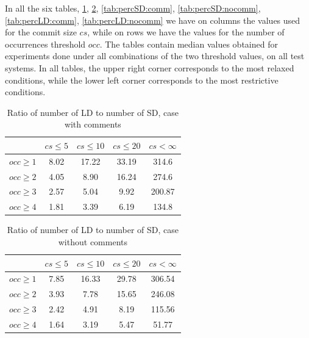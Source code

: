 \documentclass[a4paper,twoside]{article}
\begin{document}
In all the six tables, \ref{tab:ratio:comm}, \ref{tab:ratio:nocomm}, \ref{tab:percSD:comm}, \ref{tab:percSD:nocomm},
\ref{tab:percLD:comm}, \ref{tab:percLD:nocomm} we have on columns the values used for the commit size $cs$, while on rows we have the values for the number of occurrences threshold $occ$. The tables contain median values obtained for experiments done under all combinations of the two threshold values, on all test systems. In all tables, the upper right corner corresponds to the most relaxed conditions, while the lower left corner corresponds to the most restrictive conditions.


\begin{table}[!h]
\renewcommand{\arraystretch}{1.25}
\caption{Ratio of number of LD to number of SD, case with comments}
\label{tab:ratio:comm}
\centering

\begin{tabular}{|c|c|c|c|c|}
\hline
	      &	$cs\leq 5$	&	$cs\leq 10$	&	$cs\leq 20$	&	$cs<\infty$	\\
\hline
$occ\geq 1$	&	8.02	&	17.22	&	33.19	&	314.6	\\
$occ\geq 2$	&	4.05	&	8.90	&	16.24	&	274.6	\\
$occ\geq 3$	&	2.57	&	5.04	&	9.92	&	200.87	\\
$occ\geq 4$	&	1.81	&	3.39	&	6.19	&	134.8	\\
\hline
\end{tabular}
\end{table}


\begin{table}[!h]
\renewcommand{\arraystretch}{1.25}
\caption{Ratio of number of LD to number of SD, case without comments}
\label{tab:ratio:nocomm}
\centering

\begin{tabular}{|c|c|c|c|c|}
\hline
	      &	$cs\leq 5$	&	$cs\leq 10$	&	$cs\leq 20$	&	$cs< \infty$	\\
\hline
$occ\geq 1$	&	7.85	&	16.33	&	29.78	&	306.54	\\
$occ\geq 2$	&	3.93	&	7.78	&	15.65	&	246.08	\\
$occ\geq 3$	&	2.42	&	4.91	&	8.19	&	115.56	\\
$occ\geq 4$	&	1.64	&	3.19	&	5.47	&	51.77	\\

\hline
\end{tabular}
\end{table}
\end{document}
